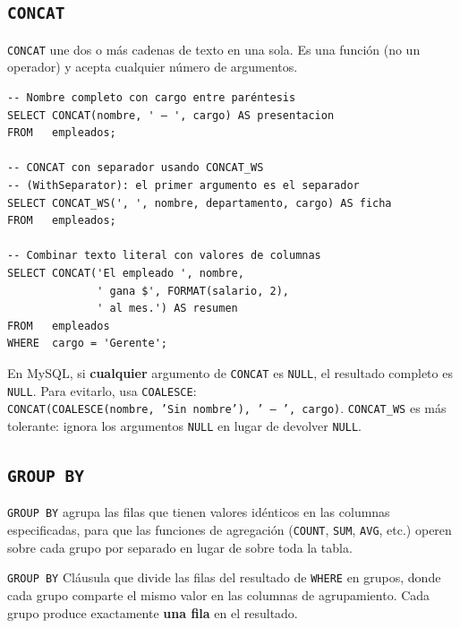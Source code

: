 \subsection{\texttt{CONCAT}}

\texttt{CONCAT} une dos o más cadenas de texto en una sola.
Es una función (no un operador) y acepta cualquier número de
argumentos.

\begin{lstlisting}[caption={CONCAT para construir cadenas compuestas.}]
-- Nombre completo con cargo entre paréntesis
SELECT CONCAT(nombre, ' — ', cargo) AS presentacion
FROM   empleados;

-- CONCAT con separador usando CONCAT_WS
-- (WithSeparator): el primer argumento es el separador
SELECT CONCAT_WS(', ', nombre, departamento, cargo) AS ficha
FROM   empleados;

-- Combinar texto literal con valores de columnas
SELECT CONCAT('El empleado ', nombre,
              ' gana $', FORMAT(salario, 2),
              ' al mes.') AS resumen
FROM   empleados
WHERE  cargo = 'Gerente';
\end{lstlisting}

\begin{nota}
En MySQL, si \textbf{cualquier} argumento de \texttt{CONCAT} es
\texttt{NULL}, el resultado completo es \texttt{NULL}.
Para evitarlo, usa \texttt{COALESCE}: \\
\texttt{CONCAT(COALESCE(nombre, 'Sin nombre'), ' — ', cargo)}.
\texttt{CONCAT\_WS} es más tolerante: ignora los argumentos
\texttt{NULL} en lugar de devolver \texttt{NULL}.
\end{nota}

\subsection{\texttt{GROUP BY}}

\texttt{GROUP BY} agrupa las filas que tienen valores idénticos en
las columnas especificadas, para que las funciones de agregación
(\texttt{COUNT}, \texttt{SUM}, \texttt{AVG}, etc.) operen sobre
cada grupo por separado en lugar de sobre toda la tabla.

\begin{definicion}{\texttt{GROUP BY}}
Cláusula que divide las filas del resultado de \texttt{WHERE} en
grupos, donde cada grupo comparte el mismo valor en las columnas
de agrupamiento.
Cada grupo produce exactamente \textbf{una fila} en el resultado.
\end{definicion}

